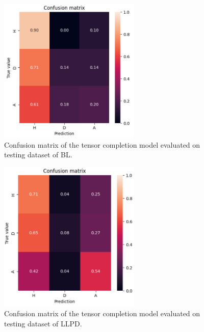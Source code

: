 \documentclass[thesis=M,english]{FITthesis}[2019/12/23]
\begin{document}
\begin{figure}[h]
    \centering
    \includegraphics[width=0.6\textwidth]{figures/cm_bl.png}
    \caption{Confusion matrix of the tensor completion model evaluated on testing dataset of BL.}
    \label{fig:cm_bl}
\end{figure}

\begin{figure}[h]
    \centering
    \includegraphics[width=0.6\textwidth]{figures/cm_llpd.png}
    \caption{Confusion matrix of the tensor completion model evaluated on testing dataset of LLPD.}
    \label{fig:cm_bllpd}
\end{figure}
\end{document}
